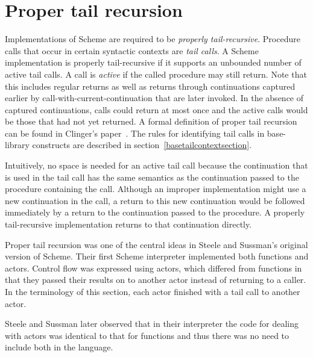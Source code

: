 \section{Proper tail recursion}
\label{proper tail recursion}

Implementations of Scheme are required to be
{\em properly tail-recursive}.
Procedure calls that occur in certain syntactic
contexts are \textit{tail calls}.  A Scheme implementation is
properly tail-recursive if it supports an unbounded number of active
tail calls.  A call is {\em active} if the called procedure may still
return.  Note that this includes regular returns as well as returns
through continuations captured earlier by
{\cf call-with-current-continuation} that are later invoked.
In the absence of captured continuations, calls could
return at most once and the active calls would be those that had not
yet returned.
A formal definition of proper tail recursion can be found
in Clinger's paper~\cite{propertailrecursion}.  The rules for identifying tail calls
in base-library constructs are described in
section~\ref{basetailcontextsection}.

\begin{rationale}

Intuitively, no space is needed for an active tail call because the
continuation that is used in the tail call has the same semantics as the
continuation passed to the procedure containing the call.  Although an improper
implementation might use a new continuation in the call, a return
to this new continuation would be followed immediately by a return
to the continuation passed to the procedure.  A properly tail-recursive
implementation returns to that continuation directly.

Proper tail recursion was one of the central ideas in Steele and
Sussman's original version of Scheme.  Their first Scheme interpreter
implemented both functions and actors.  Control flow was expressed using
actors, which differed from functions in that they passed their results
on to another actor instead of returning to a caller.  In the terminology
of this section, each actor finished with a tail call to another actor.

Steele and Sussman later observed that in their interpreter the code
for dealing with actors was identical to that for functions and thus
there was no need to include both in the language.

\end{rationale}


